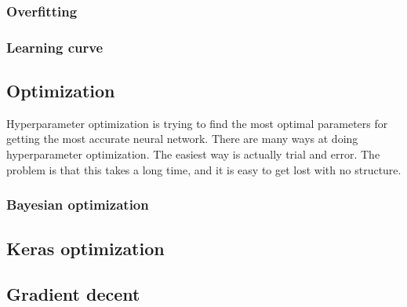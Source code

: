 \documentclass[a4paper, 12pt]{article}
\begin{document}
\subsubsection{Overfitting}

\subsubsection{Learning curve}

\subsection{Optimization}
Hyperparameter optimization is trying to find the most optimal parameters for getting the most accurate neural network. There are many ways at doing hyperparameter optimization. The easiest way is actually trial and error. The problem is that this takes a long time, and it is easy to get lost with no structure.
\subsubsection{Bayesian optimization}
\subsection{Keras optimization}
\subsection{Gradient decent}

\clearpage


\end{document}
